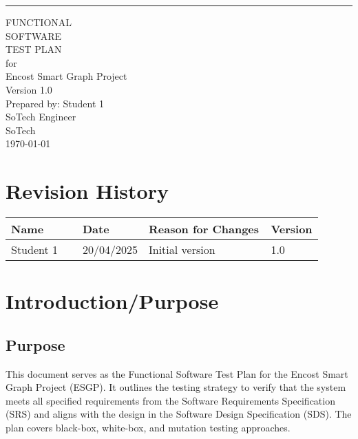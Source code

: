 \documentclass{scrreprt}
\date{}
\def\myversion{1.0 }
\begin{document}
\begin{flushright}
    \rule{16cm}{5pt}\vskip1cm
    \begin{bfseries}
        \Huge{FUNCTIONAL \\SOFTWARE \\TEST PLAN}\\
        \vspace{1.5cm}
        for\\
        \vspace{1.5cm}
        Encost Smart Graph Project\\
        \vspace{1.5cm}
        \LARGE{Version \myversion}\\
        \vspace{1.5cm}
        Prepared by: Student 1\\
        SoTech Engineer \\
        \vspace{1.5cm}
        SoTech \\
        \vspace{1.5cm}
        \today\\
    \end{bfseries}
\end{flushright}

\tableofcontents
\newpage

\chapter*{Revision History}

\begin{table}[h!]
\centering
\begin{tabular}{|p{0.25\linewidth}|p{0.1\linewidth}|p{0.45\linewidth}|p{0.1\linewidth}|}
    \hline
    Name & Date & Reason for Changes & Version \\
    \hline
    Student 1 & 20/04/2025 & Initial version & 1.0 \\
    \hline
\end{tabular}
\end{table}

\chapter{Introduction/Purpose}

\section{Purpose}
This document serves as the Functional Software Test Plan for the Encost Smart Graph Project (ESGP). It outlines the testing strategy to verify that the system meets all specified requirements from the Software Requirements Specification (SRS) and aligns with the design in the Software Design Specification (SDS). The plan covers black-box, white-box, and mutation testing approaches.
\end{document}
